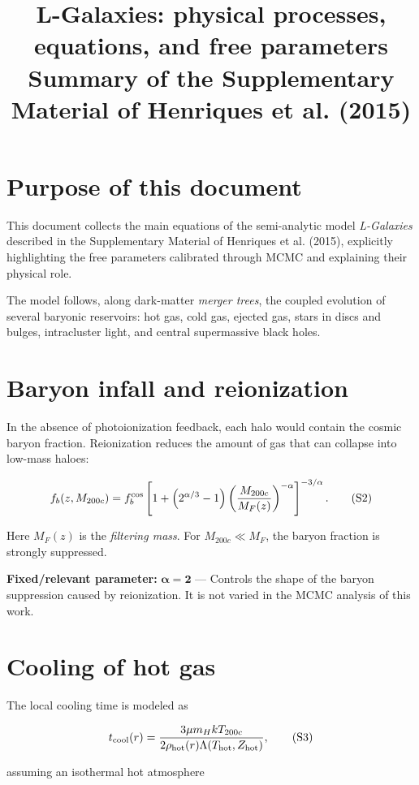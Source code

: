 \documentclass[11pt,a4paper]{article}
\title{\textbf{L-Galaxies: physical processes, equations, and free parameters}\\
\large Summary of the Supplementary Material of Henriques et al. (2015)}
\author{}
\date{}
\newcommand{\fixedparam}[2]{%
  \colorbox{fixedgray}{\parbox{0.95\linewidth}{\textbf{Fixed/relevant parameter:} $\boldsymbol{#1}$ --- #2}}%
}
\begin{document}
\maketitle

\section*{Purpose of this document}
This document collects the main equations of the semi-analytic model \textit{L-Galaxies} described in the Supplementary Material of Henriques et al. (2015), explicitly highlighting the free parameters calibrated through MCMC and explaining their physical role.

The model follows, along dark-matter \textit{merger trees}, the coupled evolution of several baryonic reservoirs: hot gas, cold gas, ejected gas, stars in discs and bulges, intracluster light, and central supermassive black holes.

\section{Baryon infall and reionization}
In the absence of photoionization feedback, each halo would contain the cosmic baryon fraction. Reionization reduces the amount of gas that can collapse into low-mass haloes:

\begin{equation}
 f_b(z,M_{200c}) = f_b^{\rm cos}
 \left[
 1+\left(2^{\alpha/3}-1\right)
 \left(\frac{M_{200c}}{M_F(z)}\right)^{-\alpha}
 \right]^{-3/\alpha}.
 \tag{S2}
\end{equation}

Here $M_F(z)$ is the \textit{filtering mass}. For $M_{200c}\ll M_F$, the baryon fraction is strongly suppressed.

\fixedparam{\alpha=2}{Controls the shape of the baryon suppression caused by reionization. It is not varied in the MCMC analysis of this work.}

\section{Cooling of hot gas}
The local cooling time is modeled as

\begin{equation}
 t_{\rm cool}(r)=
 \frac{3\mu m_H k T_{200c}}
 {2\rho_{\rm hot}(r)\Lambda(T_{\rm hot},Z_{\rm hot})},
 \tag{S3}
\end{equation}

assuming an isothermal hot atmosphere
\end{document}
